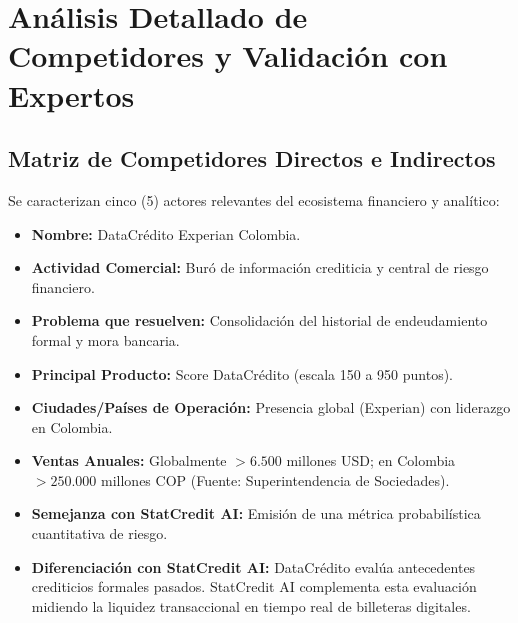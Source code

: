 \documentclass[11pt,a4paper]{article}
\begin{document}
\section{Análisis Detallado de Competidores y Validación con Expertos}

\subsection{Matriz de Competidores Directos e Indirectos}
Se caracterizan cinco (5) actores relevantes del ecosistema financiero y analítico:

\begin{tcolorbox}[title=1. Competidor: DataCrédito Experian]
\begin{itemize}[leftmargin=*, noitemsep]
    \item \textbf{Nombre:} DataCrédito Experian Colombia.
    \item \textbf{Actividad Comercial:} Buró de información crediticia y central de riesgo financiero.
    \item \textbf{Problema que resuelven:} Consolidación del historial de endeudamiento formal y mora bancaria.
    \item \textbf{Principal Producto:} Score DataCrédito (escala 150 a 950 puntos).
    \item \textbf{Ciudades/Países de Operación:} Presencia global (Experian) con liderazgo en Colombia.
    \item \textbf{Ventas Anuales:} Globalmente $>6.500$ millones USD; en Colombia $>250.000$ millones COP (Fuente: Superintendencia de Sociedades).
    \item \textbf{Semejanza con StatCredit AI:} Emisión de una métrica probabilística cuantitativa de riesgo.
    \item \textbf{Diferenciación con StatCredit AI:} DataCrédito evalúa antecedentes crediticios formales pasados. StatCredit AI complementa esta evaluación midiendo la liquidez transaccional en tiempo real de billeteras digitales.
\end{itemize}
\end{tcolorbox}
\end{document}
